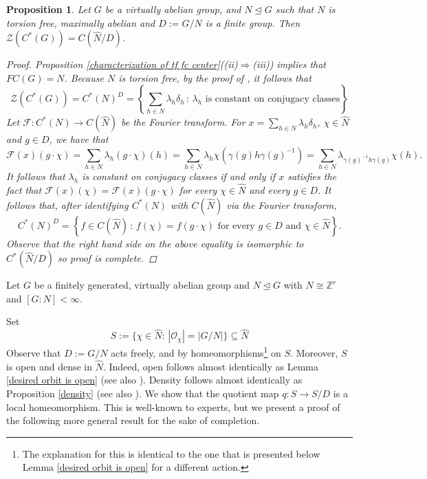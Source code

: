 \documentclass[11pt, twoside]{amsart}
\newcommand{\mc}{\mathcal}
\newtheorem{prop}[thm]{Proposition}
\theoremstyle{definition}
\newcommand{\B}{\mathbb}
\newcommand{\Z}{\B{Z}}
\newcommand{\ZZ}{\mathcal{Z}}
\begin{document}
\begin{prop}\label{computing the center of certain va groups}
    Let $G$ be a virtually abelian group, and $N\unlhd G$ such that $N$ is torsion free, maximally abelian and $D:=G/N$ is a finite group. Then $\ZZ(C^*(G))=C(\widehat{N}/D)$.
    \begin{proof}
        Proposition \ref{characterization of tf fc center}{\em ((ii)$\Rightarrow$(iii))} implies that $FC(G)=N$. Because $N$ is torsion free, by the proof of \cite[Prop. 2.6]{tf_2_step_c*_superrigid}, it follows that 
        \[\ZZ(C^*(G))=C^*(N)^D=\left\{\sum_{h\in N}\lambda_h \delta_h\,\colon\, \lambda_h\text{ is constant on conjugacy classes}\right\}\]
        Let $\mathcal{F}:C^*(N)\rightarrow C(\widehat{N})$ be the Fourier transform. For $x=\sum_{h\in N}\lambda_h \delta_h$, $\chi \in \widehat{N}$ and $g\in D$, we have that
        \[\mathcal{F}(x)(g\cdot \chi)=\sum_{h\in N}\lambda_h(g\cdot \chi)(h)=\sum_{h\in N}\lambda_h\chi(\gamma(g)h\gamma(g)^{-1})=\sum_{h\in N}\lambda_{\gamma(g)^{-1}h\gamma(g)}\chi(h).\]
        It follows that $\lambda_h$ is constant on conjugacy classes if and only if $x$ satisfies the fact that $\mathcal{F}(x)(\chi)=\mathcal{F}(x)(g\cdot \chi)$ for every $\chi\in \widehat{N}$ and every $g\in D$. It follows that, after identifying $C^*(N)$ with $C(\widehat{N})$ via the Fourier transform, 
        \[C^*(N)^D=\left\{f\in C(\widehat{N}) \,\colon\, f(\chi)=f(g\cdot \chi)\text{ for every }g\in D \text{ and }\chi\in \widehat{N}\right\}.\] Observe that the right hand side on the above equality is isomorphic to $C^*(\widehat{N}/D)$ so proof is complete.
    \end{proof}
\end{prop}
  Let $G$ be a finitely generated, virtually abelian group and $N\unlhd G$ with $N\cong \Z^r$ and $[G:N]<\infty$. \par
  Set $$S:=\{\chi \in \widehat{N}: \, |\mc{O}_{\chi}|=|G/N|\}\subseteq \widehat{N}$$ Observe that $D:=G/N$ acts freely, and by homeomorphisms\footnote{The explanation for this is identical to the one that is presented below Lemma \ref{desired orbit is open} for a different action.} on $S$. 
   Moreover, $S$ is open and dense in $\widehat{N}.$ Indeed, open follows almost identically as Lemma \ref{desired orbit is open} (see also \cite[Prop. 4.12]{CW24}). Density follows almost identically as Proposition \ref{density} (see also \cite[Lemma 2.1]{strongly_qd_eckhardt}). We show that the quotient map $q:S\to S/D$ is a local homeomorphism. This is well-known to experts, but we present a proof of the following more general result for the sake of completion.
\end{document}
